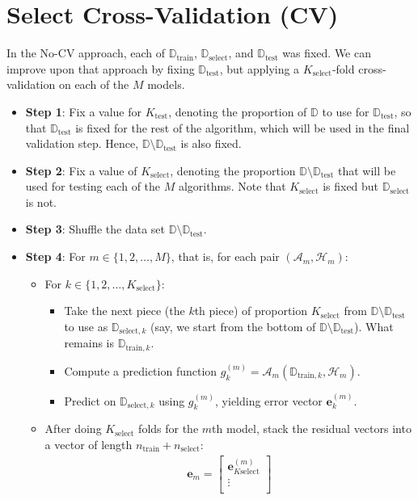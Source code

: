 \documentclass[12pt, a4paper]{article}
\theoremstyle{definition}
\newcommand{\test}{\text{test}}
\newcommand{\train}{\text{train}}
\newcommand{\select}{\text{select}}
\newcommand{\Dtest}{\mathbb{D}_{\test}}
\newcommand{\Dtrain}{\mathbb{D}_{\train}}
\newcommand{\Dselect}{\mathbb{D}_{\select}}
\begin{document}
	\section*{Select Cross-Validation (CV)}
	In the No-CV approach, each of $\Dtrain$, $\Dselect$, and $\Dtest$ was fixed.
	We can improve upon that approach by fixing $\Dtest$, but applying a $K_\select$-fold
	cross-validation on each of the $M$ models.
	\begin{itemize}
		\item \textbf{Step 1}: Fix a value for $K_\test$, denoting the proportion
		of $\mathbb{D}$ to use for $\Dtest$, so that $\Dtest$ is fixed for the rest
		of the algorithm, which will be used in the final validation step.
		Hence, $\mathbb{D}\setminus \Dtest$ is also fixed.
		\item \textbf{Step 2}: Fix a value of $K_\select$, denoting the proportion $\mathbb{D}\setminus \Dtest$
		that will be used for testing each of the $M$ algorithms. Note that $K_\select$
		is fixed but $\Dselect$ is not.
		\item \textbf{Step 3}: Shuffle the data set $\mathbb{D}\setminus \Dtest$.
		\item \textbf{Step 4}: For $m\in \{1,2,\ldots,M\}$, that is, for each pair
		$(\mathcal{A}_m,\mathcal{H}_m)$:
		\begin{itemize}
			\item For $k\in \{1,2,\ldots,K_\select\}$:
			\begin{itemize}
				\item Take the next piece (the $k$th piece) of proportion $K_\select$
				from $\mathbb{D}\setminus \Dtest$ to use as $\mathbb{D}_{\text{select}, k}$
				(say, we start from the bottom of $\mathbb{D}\setminus \Dtest$).
				What remains is $\mathbb{D}_{\text{train}, k}$.
				\item Compute a prediction function $g_{k}^{(m)}=\mathcal{A}_m(\mathbb{D}_{\train, k}, \mathcal{H}_m)$.
				\item Predict on $\mathbb{D}_{\select, k}$ using $g_{k}^{(m)}$, yielding error
				vector $\bm{e}_k^{(m)}$.
			\end{itemize}
			\item After doing $K_\select$ folds for the $m$th model, stack the residual
			vectors into a vector of length $n_\train + n_\select$:
			\begin{align*}
				\bm{e}_m = 
					\begin{bmatrix}
						\bm{e}_{K\select}^{(m)}\\
						\vdots\\

\end{bmatrix}
\end{align*}
\end{itemize}
\end{itemize}
\end{document}
